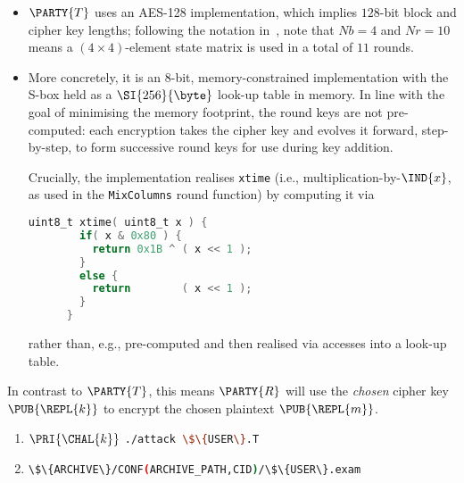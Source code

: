 \begin{itemize}
\item $\PARTY{T}$ 
      uses an AES-128 implementation, which implies $128$-bit block and 
      cipher key lengths;
      following the notation in~\cite[Figure 5]{SCALE:FIPS:197:01}, note
      that 
      $
      Nb =  4
      $ 
      and 
      $
      Nr = 10
      $ 
      means a $( 4 \times 4 )$-element state matrix is used in a total of 
      $11$ rounds.
\item More concretely, it is an $8$-bit, memory-constrained implementation
      with the S-box held as a $\SI{256}{\byte}$ look-up table in memory. 
      In line with the goal of minimising the memory footprint, the round
      keys are not pre-computed: each encryption takes the cipher key and
      evolves it forward, step-by-step, to form successive round keys for
      use during key addition.  

      Crucially, the implementation realises 
      \lstinline[language={C}]|xtime| 
      (i.e., multiplication-by-$\IND{x}$, as used in the \lstinline{MixColumns} round function) 
      by computing it via

      \begin{lstlisting}[language={C},gobble={6},frame={single},basicstyle={\ttfamily\small}]
      uint8_t xtime( uint8_t x ) {
        if( x & 0x80 ) {
          return 0x1B ^ ( x << 1 );
        }
        else {
          return        ( x << 1 );
        }
      }
      \end{lstlisting}

      \noindent
      rather than, e.g., pre-computed and then realised via accesses into 
      a look-up table.
\end{itemize}


%
In contrast to 
$\PARTY{T}$, 
this means 
$\PARTY{R}$ 
will use the
{\em chosen} cipher key $\PUB{\REPL{k}}$ 
to encrypt the
     chosen  plaintext  $\PUB{\REPL{m}}$.



\begin{enumerate}
\item \DESCTASKIMPL
      {$\PRI{\CHAL{k}}$}
      {\mbox{\lstinline[language={bash}]|./attack \$\{USER\}.T|}}
\item \DESCTASKEXAM
      {\mbox{\lstinline[language={bash}]|\$\{ARCHIVE\}/CONF(ARCHIVE_PATH,CID)/\$\{USER\}.exam|}}
\end{enumerate}


